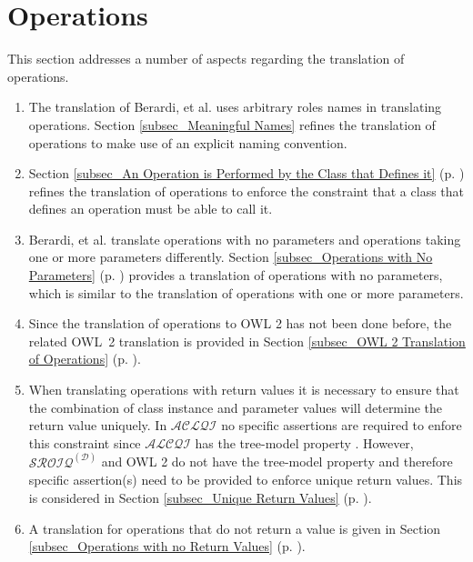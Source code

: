  
    
   
\section{Operations} \label{sec_Operations Revisited}
This section addresses a number of aspects regarding the translation of operations.
\begin{enumerate}
 \item The translation of Berardi, et al. \cite{Berardi2005} uses arbitrary roles names in translating operations. Section \ref{subsec_Meaningful Names} refines the 
translation of operations to make use of an explicit naming convention. 
  \item Section \ref{subsec_An Operation is Performed by the Class that Defines it} (p. \pageref{subsec_An Operation is Performed by the Class that Defines it})
refines the translation of operations to enforce the constraint that a class that defines an operation must be able to call it.
  \item Berardi, et al. \cite{Berardi2005} translate operations with no parameters and operations taking one or more parameters differently.
Section \ref{subsec_Operations with No Parameters} (p. \pageref{subsec_Operations with No Parameters}) provides a translation of operations with no parameters, which is similar to the translation 
of operations with one or more parameters.
  \item Since the translation of operations to OWL 2 has not been done before, the related OWL~2 translation is provided in Section \ref{subsec_OWL 2 Translation of Operations} 
(p. \pageref{subsec_OWL 2 Translation of Operations}).
  \item When translating operations with return values it is necessary to ensure that the combination of class instance and parameter values will determine the return value uniquely.
In $\mathcal{ACLQI}$ no specific assertions are required to enfore this constraint since 
$\mathcal{ALCQI}$ has the tree-model property \cite{Berardi2005}. However, $\mathcal{SROIQ}^{(\mathcal{D})}$ and OWL 2 do not have the tree-model property \cite{Horrocks2007,Krotzsch2010} and therefore 
specific assertion(s) need to be provided to enforce unique return values. This is considered in Section \ref{subsec_Unique Return Values} (p. \pageref{subsec_Unique Return Values}).
 \item A translation for operations that do not return a value is given in Section
\ref{subsec_Operations with no Return Values} (p. \pageref{subsec_Operations with no Return Values}).
\end{enumerate}

